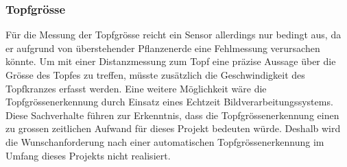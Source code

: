 \subsubsection{Topfgrösse}
Für die Messung der Topfgrösse reicht ein Sensor allerdings nur bedingt aus, da er aufgrund von überstehender Pflanzenerde eine Fehlmessung verursachen könnte. Um mit einer Distanzmessung zum Topf eine präzise Aussage über die Grösse des Topfes zu treffen, müsste zusätzlich die Geschwindigkeit des Topfkranzes erfasst werden. Eine weitere Möglichkeit wäre die Topfgrössenerkennung  durch Einsatz eines Echtzeit Bildverarbeitungssystems. Diese Sachverhalte führen zur Erkenntnis, dass die Topfgrössenerkennung einen zu grossen zeitlichen Aufwand für dieses Projekt bedeuten würde. Deshalb wird die Wunschanforderung nach einer automatischen Topfgrössenerkennung im Umfang dieses Projekts nicht realisiert.
